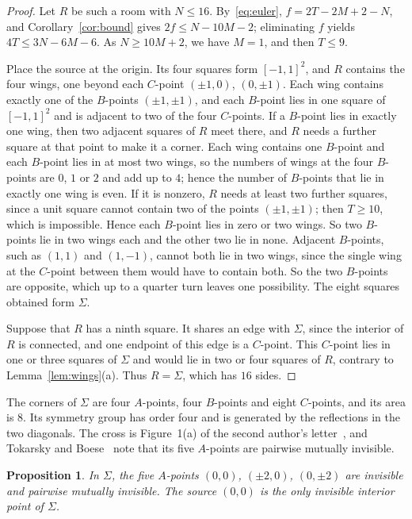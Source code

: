 \documentclass[11pt,a4paper]{article}
\theoremstyle{plain}
\newtheorem{proposition}[theorem]{Proposition}
\theoremstyle{definition}
\theoremstyle{remark}
\numberwithin{equation}{section}
\begin{document}
\begin{proof}
Let $R$ be such a room with $N\le16$. By~\eqref{eq:euler}, $f=2T-2M+2-N$, and Corollary~\ref{cor:bound} gives $2f\le N-10M-2$; eliminating $f$ yields $4T\le3N-6M-6$. As $N\ge10M+2$, we have $M=1$, and then $T\le9$.

Place the source at the origin. Its four squares form $[-1,1]^2$, and $R$ contains the four wings, one beyond each $C$-point $(\pm1,0)$, $(0,\pm1)$. Each wing contains exactly one of the $B$-points $(\pm1,\pm1)$, and each $B$-point lies in one square of $[-1,1]^2$ and is adjacent to two of the four $C$-points. If a $B$-point lies in exactly one wing, then two adjacent squares of $R$ meet there, and $R$ needs a further square at that point to make it a corner. Each wing contains one $B$-point and each $B$-point lies in at most two wings, so the numbers of wings at the four $B$-points are $0$, $1$ or $2$ and add up to $4$; hence the number of $B$-points that lie in exactly one wing is even. If it is nonzero, $R$ needs at least two further squares, since a unit square cannot contain two of the points $(\pm1,\pm1)$; then $T\ge10$, which is impossible. Hence each $B$-point lies in zero or two wings. So two $B$-points lie in two wings each and the other two lie in none. Adjacent $B$-points, such as $(1,1)$ and $(1,-1)$, cannot both lie in two wings, since the single wing at the $C$-point between them would have to contain both. So the two $B$-points are opposite, which up to a quarter turn leaves one possibility. The eight squares obtained form $\Sigma$.

Suppose that $R$ has a ninth square. It shares an edge with $\Sigma$, since the interior of $R$ is connected, and one endpoint of this edge is a $C$-point. This $C$-point lies in one or three squares of $\Sigma$ and would lie in two or four squares of $R$, contrary to Lemma~\ref{lem:wings}(a). Thus $R=\Sigma$, which has $16$ sides.
\end{proof}

The corners of $\Sigma$ are four $A$-points, four $B$-points and eight $C$-points, and its area is $8$. Its symmetry group has order four and is generated by the reflections in the two diagonals. The cross is Figure~1(a) of the second author's letter~\cite{Tok96}, and Tokarsky and Boese~\cite[Figure~6]{TB} note that its five $A$-points are pairwise mutually invisible.

\begin{proposition}\label{prop:sigma}
In $\Sigma$, the five $A$-points $(0,0)$, $(\pm2,0)$, $(0,\pm2)$ are invisible and pairwise mutually invisible. The source $(0,0)$ is the only invisible interior point of $\Sigma$.
\end{proposition}
\end{document}

